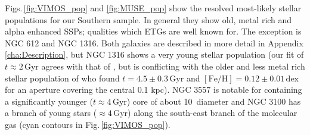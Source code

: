 		Figs.\,\ref{fig:VIMOS_pop} and \ref{fig:MUSE_pop} show the resolved most-likely stellar populations for our Southern sample. In general they show old, metal rich and alpha enhanced SSPs; qualities which ETGs are well known for. The exception is NGC 612 and NGC 1316. Both galaxies are described in more detail in Appendix \ref{cha:Description}, but NGC 1316 shows a very young stellar population (our fit of $t \approx 2$\,Gyr agrees with that of \citealt{Kuntschner2000}, but is conflicting with the older and less metal rich stellar population of \citealt{Koleva2011} who found $t=4.5 \pm 0.3 \,\mathrm{Gyr}$ and $\mathrm{[Fe/H]}=0.12 \pm 0.01 \,\mathrm{dex}$ for an aperture covering the central 0.1 kpc). NGC 3557 is notable for containing a significantly younger ($t\approx 4$\,Gyr) core of about 10\arcsec\ diameter and NGC 3100 has a branch of young stars ($\approx 4$\,Gyr) along the south-east branch of the molecular gas (cyan contours in Fig.\,\ref{fig:VIMOS_pop}).


